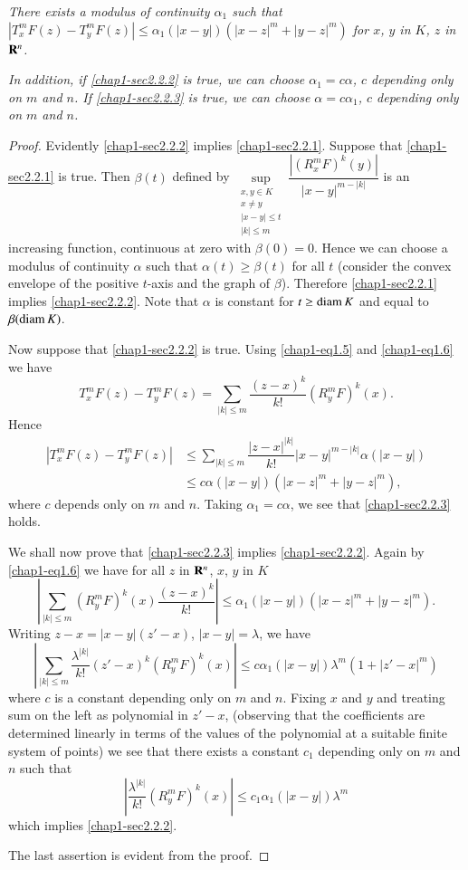 \subsubsection{}\label{chap1-sec2.2.3}
{\em There exists a modulus of continuity $\alpha_{1}$ such that $|T^{m}_{x}F(z)-T^{m}_{y}F(z)|\leq \alpha_{1}(|x-y|)(|x-z|^{m}+|y-z|^{m})$ for $x$, $y$ in $K$, $z$ in $\mathbf{R}^{n}$.}

{\em In addition, if \eqref{chap1-sec2.2.2} is true, we can choose $\alpha_{1}=c\alpha$, $c$ depending only on $m$ and $n$. If \eqref{chap1-sec2.2.3} is true, we can choose $\alpha=c\alpha_{1}$, $c$ depending only on $m$ and $n$.}

\begin{proof}
Evidently \eqref{chap1-sec2.2.2} implies \eqref{chap1-sec2.2.1}. Suppose that \eqref{chap1-sec2.2.1} is true. Then $\beta(t)$ defined by $\sup\limits_{\substack{x,y\in K\\ x\neq y\\ |x-y|\leq t\\ |k|\leq m}}\dfrac{|(R^{m}_{x}F)^{k}(y)|}{|x-y|^{m-|k|}}$ is an increasing function, continuous at zero with $\beta(0)=0$. Hence we can choose a modulus of continuity $\alpha$ such that $\alpha(t)\geq \beta(t)$ for all $t$ (consider the convex envelope of the positive $t$-axis and the graph of $\beta$). Therefore \eqref{chap1-sec2.2.1} implies \eqref{chap1-sec2.2.2}. Note that $\alpha$ is constant for $t\geq \operatorname{diam} K$ and equal to $\beta(\operatorname{diam} K)$.

Now suppose that \eqref{chap1-sec2.2.2} is true. Using \eqref{chap1-eq1.5} and \eqref{chap1-eq1.6} we have
$$
T^{m}_{x}F(z)-T^{m}_{y}F(z)=\sum\limits_{|k|\leq m}\dfrac{(z-x)^{k}}{k!}(R^{m}_{y}F)^{k}(x).
$$
Hence
\begin{align*}
|T^{m}_{x}F(z)-T^{m}_{y}F(z)| &\leq \sum\limits_{|k|\leq m}\dfrac{|z-x|^{|k|}}{k!}|x-y|^{m-|k|}\alpha(|x-y|)\\
&\leq c\alpha (|x-y|)(|x-z|^{m}+|y-z|^{m}),
\end{align*}
where $c$ depends only on $m$ and $n$. Taking $\alpha_{1}=c\alpha$, we see that \eqref{chap1-sec2.2.3} holds.

We shall now prove that \eqref{chap1-sec2.2.3} implies \eqref{chap1-sec2.2.2}. Again by \eqref{chap1-eq1.6} we have for all $z$ in $\mathbf{R}^{n}$, $x$, $y$ in $K$
$$
\left|\sum\limits_{|k|\leq m}(R^{m}_{y}F)^{k}(x)\dfrac{(z-x)^{k}}{k!}\right|\leq \alpha_{1}(|x-y|)(|x-z|^{m}+|y-z|^{m}).
$$
Writing $z-x=|x-y|(z'-x)$, $|x-y|=\lambda$, we have
$$
\left|\sum\limits_{|k|\leq m}\dfrac{\lambda^{|k|}}{k!}(z'-x)^{k}(R^{m}_{y}F)^{k}(x)\right|\leq c\alpha_{1}(|x-y|)\lambda^{m}(1+|z'-x|^{m})
$$
where $c$ is a constant depending only on $m$ and $n$. Fixing $x$ and $y$ and treating sum on the left as polynomial in $z'-x$, (observing that the coefficients are determined linearly in terms of the values of the polynomial at a suitable finite system of points) we see that there exists a constant $c_{1}$ depending only on $m$ and $n$ such that
$$
\left|\dfrac{\lambda^{|k|}}{k!}(R^{m}_{y}F)^{k}(x)\right|\leq c_{1}\alpha_{1}(|x-y|)\lambda^{m}
$$
which implies \eqref{chap1-sec2.2.2}.

The last assertion is evident from the proof.
\end{proof}

